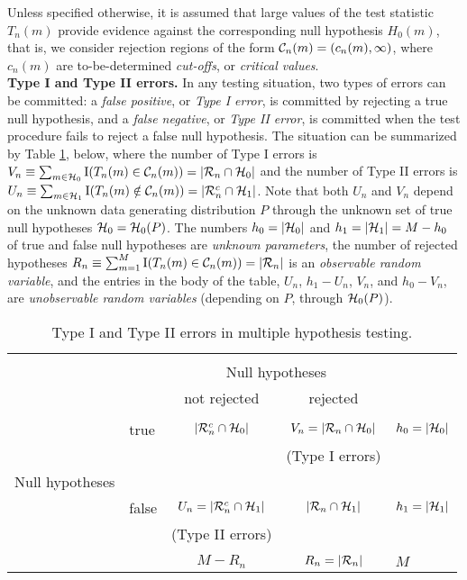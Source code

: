 \documentclass[11pt]{article}
\begin{document}
Unless specified otherwise, it is assumed that large values of the test statistic $T_n(m)$ provide evidence against the corresponding null hypothesis $H_0(m)$, that is, we consider rejection regions of the form ${\cal C}_n(m) = (c_n(m),\infty)$, where $c_n(m)$ are to-be-determined {\em cut-offs}, or {\em critical values}.\\ 

\noindent
{\bf Type I and Type II errors.} In any
testing situation, two types of errors can be committed: a {\em false
positive}, or {\em Type I error}, is committed by rejecting a true
null hypothesis, and a {\em false negative}, or {\em Type
II error}, is committed when the test procedure fails to reject a false null
hypothesis. The situation can be summarized by Table \ref{anal:mult:t:TypeIandII}, below, where
the number of Type I errors is $V_n \equiv \sum_{m \in {\cal H}_0} \mathrm{I}(T_n(m) \in {\cal C}_n(m)) = |{\cal R}_n \cap {\cal H}_0|$ and the number
of Type II errors is $U_n \equiv \sum_{m \in {\cal H}_1} \mathrm{I}(T_n(m) \notin {\cal C}_n(m)) = |{\cal R}_n^c \cap {\cal H}_1|$. Note that both $U_n$
and $V_n$ depend on the unknown data generating distribution $P$ through
the unknown set of true null hypotheses ${\cal H}_0 = {\cal H}_0(P)$. The numbers $h_0=|{\cal H}_0|$ and $h_1 = |{\cal H}_1| = M-h_0$ of true and false null hypotheses are
{\em unknown parameters}, the number of rejected hypotheses $R_n \equiv \sum_{m=1}^M  \mathrm{I}(T_n(m) \in {\cal C}_n(m)) = |{\cal R}_n|$ is an {\em observable random variable}, and the entries in the body of the table, $U_n$, $h_1 -
U_n$, $V_n$, and $h_0-V_n$, are
{\em unobservable random variables} (depending on $P$, through ${\cal H}_0(P)$). 
\begin{table}[hhh]
\caption{Type I and Type II errors in multiple hypothesis testing.}
\label{anal:mult:t:TypeIandII}
\begin{tabular}{ll|cc|l}
\multicolumn{5}{c}{} \\
\multicolumn{2}{c}{} & \multicolumn{2}{c}{Null hypotheses} & \multicolumn{1}{c}{}\\
\multicolumn{2}{c}{} & \multicolumn{1}{c}{not rejected} & \multicolumn{1}{c}{rejected} & \multicolumn{1}{c}{} \\
\cline{3-4}
&&&&\\
& true & $| {\cal R}_n^c \cap {\cal H}_0 |$ &
$V_n = | {\cal R}_n \cap {\cal H}_0 |$ &
$h_0=| {\cal H}_0|$\\
&&&(Type I errors)&\\
Null hypotheses&&&&\\
& false & $U_n = | {\cal R}_n^c \cap {\cal H}_1 |$ & $| {\cal R}_n \cap {\cal H}_1 |$ & $h_1=| {\cal H}_1
|$\\
&&(Type II errors)&&\\
&&&&\\
\cline{3-4}
\multicolumn{2}{c}{}& \multicolumn{1}{c}{$M-R_n$} &
\multicolumn{1}{c}{ $R_n = | {\cal R}_n|$}
&\multicolumn{1}{l}{$M$}\\
\end{tabular}
\end{table}
\end{document}
